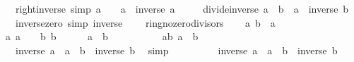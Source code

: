 \begin{isabellebody}
\ \ \ right{\isacharunderscore}{\kern0pt}inverse\ {\isacharbrackleft}{\kern0pt}simp{\isacharbrackright}{\kern0pt}{\isacharcolon}{\kern0pt}\ {\isachardoublequoteopen}a\ {\isasymnoteq}\ {}\ {\isasymLongrightarrow}\ a\ {\isacharasterisk}{\kern0pt}\ inverse\ a\ {\isacharequal}{\kern0pt}\ {}{\isachardoublequoteclose}\isanewline
\ \ \ divide{\isacharunderscore}{\kern0pt}inverse{\isacharcolon}{\kern0pt}\ {\isachardoublequoteopen}a\ {\isacharslash}{\kern0pt}\ b\ {\isacharequal}{\kern0pt}\ a\ {\isacharasterisk}{\kern0pt}\ inverse\ b{\isachardoublequoteclose}\isanewline
\ \ \ inverse{\isacharunderscore}{\kern0pt}zero\ {\isacharbrackleft}{\kern0pt}simp{\isacharbrackright}{\kern0pt}{\isacharcolon}{\kern0pt}\ {\isachardoublequoteopen}inverse\ {}\ {\isacharequal}{\kern0pt}\ {}{\isachardoublequoteclose}\isanewline
{}\isanewline
\isanewline
{}\isamarkupfalse%
\ ring{\isacharunderscore}{\kern0pt}{}{\isacharunderscore}{\kern0pt}no{\isacharunderscore}{\kern0pt}zero{\isacharunderscore}{\kern0pt}divisors\isanewline
%
\isadelimproof
%
\endisadelimproof
%
\isatagproof
{}\isamarkupfalse%
\isanewline
\ \ \isamarkupfalse%
\ a\ b\ {\isacharcolon}{\kern0pt}{\isacharcolon}{\kern0pt}\ {\isacharprime}{\kern0pt}a\isanewline
\ \ \isamarkupfalse%
\ a{\isacharcolon}{\kern0pt}\ {\isachardoublequoteopen}a\ {\isasymnoteq}\ {}{\isachardoublequoteclose}\ \ b{\isacharcolon}{\kern0pt}\ {\isachardoublequoteopen}b\ {\isasymnoteq}\ {}{\isachardoublequoteclose}\isanewline
\ \ \isamarkupfalse%
\ {\isachardoublequoteopen}a\ {\isacharasterisk}{\kern0pt}\ b\ {\isasymnoteq}\ {}{\isachardoublequoteclose}\isanewline
\ \ \isamarkupfalse%
\isanewline
\ \ \ \ \isamarkupfalse%
\ ab{\isacharcolon}{\kern0pt}\ {\isachardoublequoteopen}a\ {\isacharasterisk}{\kern0pt}\ b\ {\isacharequal}{\kern0pt}\ {}{\isachardoublequoteclose}\isanewline
\ \ \ \ \isamarkupfalse%
\ {\isachardoublequoteopen}{}\ {\isacharequal}{\kern0pt}\ inverse\ a\ {\isacharasterisk}{\kern0pt}\ {\isacharparenleft}{\kern0pt}a\ {\isacharasterisk}{\kern0pt}\ b{\isacharparenright}{\kern0pt}\ {\isacharasterisk}{\kern0pt}\ inverse\ b{\isachardoublequoteclose}\ \isamarkupfalse%
\ simp\isanewline
\ \ \ \ \isamarkupfalse%
\ \isamarkupfalse%
\ {\isachardoublequoteopen}{\isasymdots}\ {\isacharequal}{\kern0pt}\ {\isacharparenleft}{\kern0pt}inverse\ a\ {\isacharasterisk}{\kern0pt}\ a{\isacharparenright}{\kern0pt}\ {\isacharasterisk}{\kern0pt}\ {\isacharparenleft}{\kern0pt}b\ {\isacharasterisk}{\kern0pt}\ inverse\ b{\isacharparenright}{\kern0pt}{\isachardoublequoteclose}\isanewline

\end{isabellebody}
